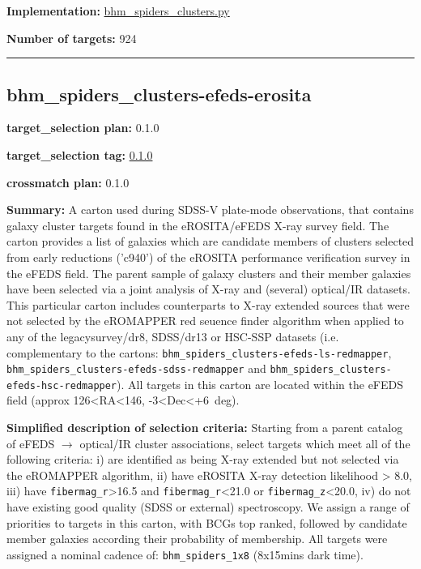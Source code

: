 \noindent\textbf{Implementation:}
\href{https://github.com/sdss/target_selection/blob/0.1.0/python/target_selection/cartons/bhm_spiders_clusters.py}{bhm\_spiders\_clusters.py}

\noindent\textbf{Number of targets:} 924

\begin{center}\rule{0.5\linewidth}{0.5pt}\end{center}

\hypertarget{bhm_spiders_clusters-efeds-erosita_plan0.1.0}{%
\subsection{bhm\_spiders\_clusters-efeds-erosita}\label{bhm_spiders_clusters-efeds-erosita_plan0.1.0}}

\noindent\textbf{target\_selection plan:} 0.1.0

\noindent\textbf{target\_selection tag:}
\href{https://github.com/sdss/target_selection/tree/0.1.0/}{0.1.0}

\noindent\textbf{crossmatch plan:} 0.1.0

\noindent\textbf{Summary:} A carton used during SDSS-V plate-mode observations,
that contains galaxy cluster targets found in the eROSITA/eFEDS X-ray
survey field. The carton provides a list of galaxies which are candidate
members of clusters selected from early reductions ('c940') of the
eROSITA performance verification survey in the eFEDS field. The parent
sample of galaxy clusters and their member galaxies have been selected
via a joint analysis of X-ray and (several) optical/IR datasets. This
particular carton includes counterparts to X-ray extended sources that
were not selected by the eROMAPPER red seuence finder algorithm when
applied to any of the legacysurvey/dr8, SDSS/dr13 or HSC-SSP datasets
(i.e. complementary to the cartons:
\texttt{bhm\_spiders\_clusters-efeds-ls-redmapper},
\texttt{bhm\_spiders\_clusters-efeds-sdss-redmapper} and
\texttt{bhm\_spiders\_clusters-efeds-hsc-redmapper}). All targets in
this carton are located within the eFEDS field (approx
126\textless RA\textless146, -3\textless Dec\textless+6~deg).

\noindent\textbf{Simplified description of selection criteria:} Starting from a
parent catalog of eFEDS $\rightarrow$ optical/IR cluster associations, select
targets which meet all of the following criteria: i) are identified as
being X-ray extended but not selected via the eROMAPPER algorithm, ii)
have eROSITA X-ray detection likelihood \textgreater{} 8.0, iii) have
\texttt{fibermag\_r}\textgreater16.5 and
\texttt{fibermag\_r}\textless21.0 or \texttt{fibermag\_z}\textless20.0,
iv) do not have existing good quality (SDSS or external) spectroscopy.
We assign a range of priorities to targets in this carton, with BCGs top
ranked, followed by candidate member galaxies according their
probability of membership. All targets were assigned a nominal cadence
of: \texttt{bhm\_spiders\_1x8} (8x15mins dark time).


